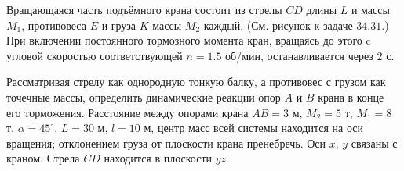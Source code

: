 Вращающаяся часть подъёмного крана состоит из стрелы $CD$ длины $L$
и массы $M_1$, противовеса $E$ и груза $K$ массы $M_2$ каждый.
(См. рисунок к задаче $34.31$.)
При включении постоянного тормозного момента кран,
вращаясь до этого c угловой скоростью соответствующей $n = 1.5$ об/мин,
останавливается через $2$ с.

Рассматривая стрелу как однородную тонкую балку, а противовес с грузом
как точечные массы, определить динамические реакции опор $A$ и $B$
крана в конце его торможения.
Расстояние между опорами крана $AB = 3$ м, $M_2 = 5$ т, $M_1 = 8$ т,
$\alpha = 45^{\circ}$, $L = 30$ м, $l = 10$ м,
центр масс всей системы находится на оси вращения;
отклонением груза от плоскости крана пренебречь.
Оси $x$, $y$ связаны с краном.
Стрела $CD$ находится в плоскости $yz$.
